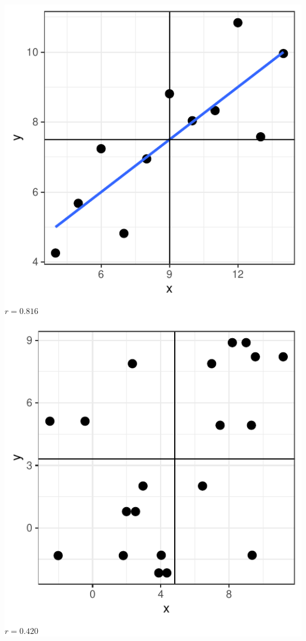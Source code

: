 \begin{fullwidth}
  \colorbox{white}{
    \parbox{\linewidth}{
  \begin{multicols*}{2}
    \begin{center}
      \includegraphics[width=0.6\linewidth]{figure-latex/unnamed-chunk-4-7-1}\\
      $r= 0.816$
    \end{center}

  \columnbreak

  \begin{center}
    \includegraphics[width=0.6\linewidth]{figure-latex/unnamed-chunk-4-8-1}\\
    \(r=0.420\)
  \end{center}
\end{multicols*}
    }}
\end{fullwidth}




